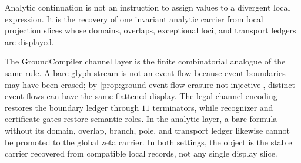 \begin{principle}
\label{prin:rh-projection-recovery}
Analytic continuation is not an instruction to assign values to a divergent
local expression.  It is the recovery of one invariant analytic carrier from
local projection slices whose domains, overlaps, exceptional loci, and
transport ledgers are displayed.
\end{principle}

\begin{remark}
\label{rem:rh-eventflow-analytic-continuation-analogue}
The GroundCompiler channel layer is the finite combinatorial analogue of the
same rule.  A bare glyph stream is not an event flow because event boundaries
may have been erased; by \autoref{prop:ground-event-flow-erasure-not-injective},
distinct event flows can have the same flattened display.  The legal channel
encoding restores the boundary ledger through $11$ terminators, while
recognizer and certificate gates restore semantic roles.  In the analytic
layer, a bare formula without its domain, overlap, branch, pole, and transport
ledger likewise cannot be promoted to the global zeta carrier.  In both
settings, the object is the stable carrier recovered from compatible local
records, not any single display slice.
\end{remark}

